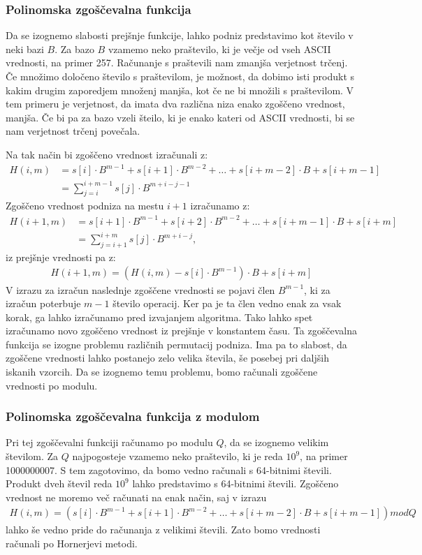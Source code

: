 \documentclass[12pt]{article}
\begin{document}
\subsubsection{Polinomska zgoščevalna funkcija}
Da se izognemo slabosti prejšnje funkcije, lahko podniz predstavimo kot število v neki bazi $B$. Za bazo $B$ vzamemo neko praštevilo, ki je večje
od vseh ASCII vrednosti, na primer 257. Računanje s praštevili nam zmanjša verjetnost trčenj. Če množimo določeno število s praštevilom, je možnost,
da dobimo isti produkt s kakim drugim zaporedjem množenj manjša, kot če ne bi množili s praštevilom. V tem primeru je verjetnost, da imata dva različna niza enako
zgoščeno vrednost, manjša. 
Če bi pa za bazo vzeli šteilo, ki je enako kateri od ASCII vrednosti, bi se nam verjetnost trčenj povečala.

Na tak način bi zgoščeno vrednost izračunali z:
\begin{align*} 
  H(i, m) &= s[i]\cdot B^{m-1} + s[i+1]\cdot B^{m-2} + … + s[i+m-2]\cdot B + s[i+m-1] \\
  &= \sum_{j=i}^{i+m-1} s[j]\cdot B^{m+i-j-1}
\end{align*}
Zgoščeno vrednost podniza na mestu $i+1$ izračunamo z:
\begin{align*} 
  H(i+1, m) &= s[i+1]\cdot B^{m-1} + s[i+2]\cdot B^{m-2} + … + s[i+m-1]\cdot B + s[i+m] \\
  &= \sum_{j=i+1}^{i+m} s[j]\cdot B^{m+i-j},
\end{align*}
iz prejšnje vrednosti pa z:
\begin{align*}
  H(i+1, m) = (H(i, m) - s[i]\cdot B^{m-1})\cdot B + s[i+m]
\end{align*}
V izrazu za izračun naslednje zgoščene vrednosti se pojavi člen $B^{m-1}$, ki za izračun poterbuje $m-1$ število operacij. Ker pa je ta člen vedno
enak za vsak korak, ga lahko izračunamo pred izvajanjem algoritma. Tako lahko spet izračunamo novo zgoščeno vrednost iz prejšnje v konstantem času.
Ta zgoščevalna funkcija se izogne problemu različnih permutacij podniza. Ima pa to slabost, da zgoščene vrednosti lahko postanejo zelo velika števila,
še posebej pri daljših iskanih vzorcih. Da se izognemo temu problemu, bomo računali zgoščene vrednosti po modulu.

\subsubsection{Polinomska zgoščevalna funkcija z modulom}
Pri tej zgoščevalni funkciji računamo po modulu $Q$, da se izognemo velikim številom. Za $Q$ najpogosteje vzamemo neko praštevilo, ki je reda $10^{9}$, na primer 1000000007.
S tem zagotovimo, da bomo vedno računali s 64-bitnimi števili. Produkt dveh števil reda $10^{9}$ lahko predstavimo s 64-bitnimi števili.
Zgoščeno vrednost ne moremo več računati na enak način, saj v izrazu
\begin{align*} 
  H(i, m) = (s[i]\cdot B^{m-1} + s[i+1]\cdot B^{m-2} + … + s[i+m-2]\cdot B + s[i+m-1])modQ
\end{align*}
lahko še vedno pride do računanja z velikimi števili. Zato bomo vrednosti računali po Hornerjevi metodi.
\end{document}
